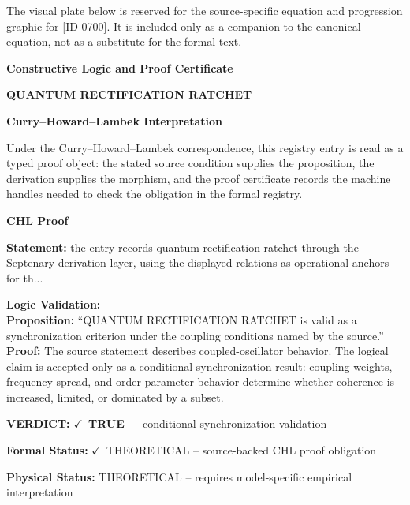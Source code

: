 \begingroup\footnotesize\sloppy
The visual plate below is reserved for the source-specific equation and progression graphic for [ID 0700]. It is included only as a companion to the canonical equation, not as a substitute for the formal text.
\par\endgroup
\ifTZPDarkEdition
{}
\fi

\clearpage
\begingroup\tzpsupportsetup
\noindent\textbf{\fontsize{10.8pt}{12.8pt}\selectfont [ID 0700] Constructive Logic and Proof Certificate}\par
\noindent\textbf{\fontsize{10pt}{12pt}\selectfont QUANTUM RECTIFICATION RATCHET}\par
\vspace{0.45em}
\begingroup
\footnotesize
\setlength{\parskip}{0.22em}
\setlength{\parindent}{0pt}
\noindent\textbf{Curry--Howard--Lambek Interpretation}\par
Under the Curry--Howard--Lambek correspondence, this registry entry is read as a typed proof
object: the stated source condition supplies the proposition, the derivation supplies the
morphism, and the proof certificate records the machine handles needed to check the obligation
in the formal registry.

\vspace{0.45em}
\noindent\textbf{CHL Proof}\par
\textbf{Statement:} the entry records quantum rectification ratchet through the Septenary derivation layer,
using the displayed relations as operational anchors for th...

\textbf{Logic Validation:}\\
\textbf{Proposition:} ``QUANTUM RECTIFICATION RATCHET is valid as a synchronization criterion under the coupling
conditions named by the source.''\\
\textbf{Proof:} The source statement describes coupled-oscillator behavior. The logical claim is
accepted only as a conditional synchronization result: coupling weights, frequency
spread, and order-parameter behavior determine whether coherence is increased, limited,
or dominated by a subset.

\textbf{VERDICT:} \ensuremath{\checkmark}\ \textbf{TRUE} --- conditional synchronization validation

\textbf{Formal Status:} \ensuremath{\checkmark}\ THEORETICAL -- source-backed CHL proof obligation

\textbf{Physical Status:} THEORETICAL -- requires model-specific empirical interpretation
\par\vspace{0.45em}
\par
\ifTZPDarkEdition
{}
\fi
\endgroup
\endgroup
